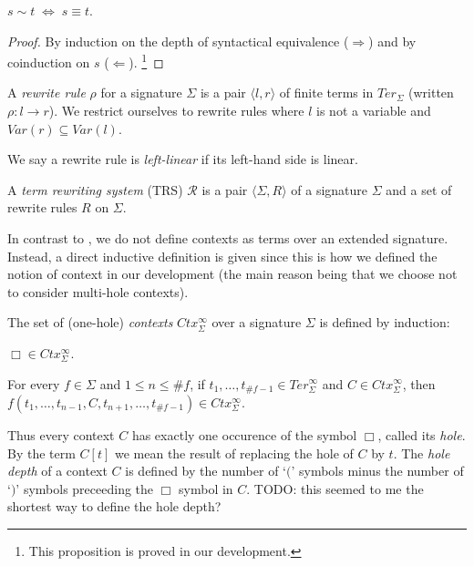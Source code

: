\begin{proposition}\label{prop:equalities}
$s \sim t \; \Leftrightarrow \; s \equiv t$.
\end{proposition}
\begin{proof}
By induction on the depth of syntactical equivalence ($\Rightarrow$) and by
coinduction on $s$ ($\Leftarrow$).
\footnote{This proposition is proved in our \Coq development.}
\end{proof}

\begin{definition}%
  A \emph{rewrite rule} $\rho$ for a signature $\Sigma$ is a pair $\langle l,
  r \rangle$ of finite terms in $Ter_\Sigma$ (written $\rho : l \rightarrow
  r$). We restrict ourselves to rewrite rules where $l$ is not a variable and
  $Var(r) \subseteq Var(l)$.
\end{definition}

We say a rewrite rule is \emph{left-linear} if its left-hand side is linear.

\begin{definition}%
A \emph{term rewriting system} (TRS) $\mathcal{R}$ is a pair $\langle \Sigma,
R \rangle$ of a signature $\Sigma$ and a set of rewrite rules $R$ on
$\Sigma$.
\end{definition}

In contrast to \cite{terese-03}, we do not define contexts as terms over an
extended signature. Instead, a direct inductive definition is given since this
is how we defined the notion of context in our \Coq development (the main
reason being that we choose not to consider multi-hole contexts).

\begin{definition}%
The set of (one-hole) \emph{contexts} $Ctx_\Sigma^\infty$ over a signature
$\Sigma$ is defined by induction:
\begin{compactenum}
  \item
    $\Box \in Ctx_\Sigma^\infty$.
  \item
    For every $f \in \Sigma$ and $1 \le n \le \#f$, if $t_1, \ldots, t_{\#f -
      1} \in Ter_\Sigma^\infty$ and $C \in Ctx_\Sigma^\infty$, then $f(t_1,
    \ldots, t_{n - 1}, C, t_{n + 1}, \ldots, t_{\#f - 1}) \in
    Ctx_\Sigma^\infty$.
\end{compactenum}
\end{definition}

Thus every context $C$ has exactly one occurence of the symbol $\Box$, called
its \emph{hole}. By the term $C[t]$ we mean the result of replacing the hole
of $C$ by $t$. The \emph{hole depth} of a context $C$ is defined by the number
of `$($' symbols minus the number of `$)$' symbols preceeding the $\Box$
symbol in $C$.
TODO: this seemed to me the shortest way to define the hole depth?

